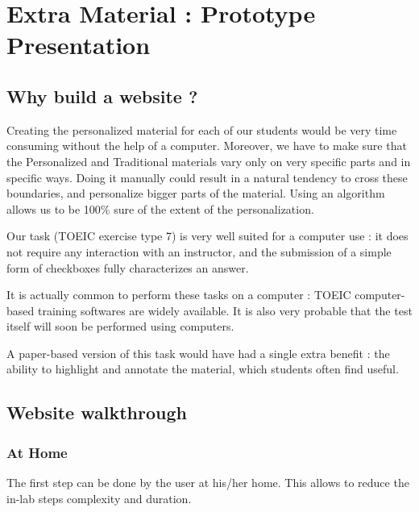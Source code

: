 \documentclass[a4paper,12pt]{article}
\begin{document}
\section{Extra Material : Prototype Presentation}

\subsection{Why build a website ?}

Creating the personalized material for each of our students would be very time consuming without the help of a computer. Moreover, we have to make sure that the Personalized and Traditional materials vary only on very specific parts and in specific ways. Doing it manually could result in a natural tendency to cross these boundaries, and personalize bigger parts of the material. Using an algorithm allows us to be 100\% sure of the extent of the personalization.

Our task (TOEIC exercise type 7) is very well suited for a computer use : it does not require any interaction with an instructor, and the submission of a simple form of checkboxes fully characterizes an answer.

It is actually common to perform these tasks on a computer : TOEIC computer-based training softwares are widely available. It is also very probable that the test itself will soon be performed using computers.

A paper-based version of this task would have had a single extra benefit : the ability to highlight and annotate the material, which students often find useful.

\subsection{Website walkthrough}

\subsubsection{At Home}

The first step can be done by the user at his/her home. This allows to reduce the in-lab steps complexity and duration.
\end{document}
